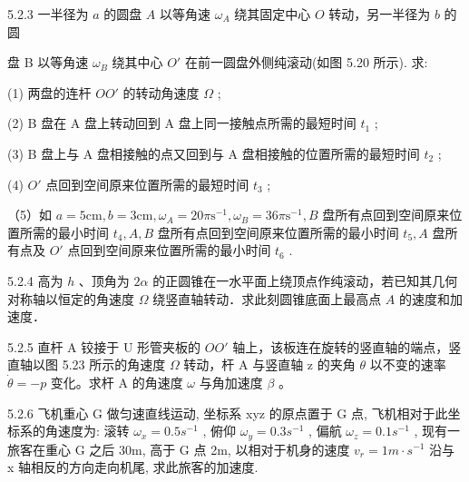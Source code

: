 \begin{problem}{5.2.3}
一半径为 $a$ 的圆盘 $A$ 以等角速 $\omega_{A}$ 绕其固定中心 $O$ 转动，另一半径为 $b$ 的圆

盘 B 以等角速 $\omega_{B}$ 绕其中心 $O'$ 在前一圆盘外侧纯滚动(如图 5.20 所示). 求:

(1) 两盘的连杆 $OO'$ 的转动角速度 $\Omega$ ;

(2) B 盘在 A 盘上转动回到 A 盘上同一接触点所需的最短时间 $t_{1}$ ;

(3) B 盘上与 A 盘相接触的点又回到与 A 盘相接触的位置所需的最短时间 $t_{2}$ ;

(4) $O'$ 点回到空间原来位置所需的最短时间 $t_3$ ;

（5）如 $a = 5\mathrm{cm}, b = 3\mathrm{cm}, \omega_A = 20\pi \mathrm{s}^{-1}, \omega_B = 36\pi \mathrm{s}^{-1}, B$ 盘所有点回到空间原来位置所需的最小时间 $t_4, A, B$ 盘所有点回到空间原来位置所需的最小时间 $t_5, A$ 盘所有点及 $O'$ 点回到空间原来位置所需的最小时间 $t_6$ .
\begin{center}

\end{center}
\end{problem}
\clearpage


\begin{problem}{5.2.4}
高为 $h$ 、顶角为 $2\alpha$ 的正圆锥在一水平面上绕顶点作纯滚动，若已知其几何对称轴以恒定的角速度 $\Omega$ 绕竖直轴转动．求此刻圆锥底面上最高点 $A$ 的速度和加速度．
\end{problem}
\clearpage


\begin{problem}{5.2.5}
直杆 A 铰接于 U 形管夹板的 $OO'$ 轴上，该板连在旋转的竖直轴的端点，竖直轴以图 5.23 所示的角速度 $\Omega$ 转动，杆 A 与竖直轴 z 的夹角 $\theta$ 以不变的速率 $\dot{\theta} = -p$ 变化。求杆 A 的角速度 $\omega$ 与角加速度 $\beta$ 。
\begin{center}

\end{center}
\end{problem}
\clearpage


\begin{problem}{5.2.6}
飞机重心 G 做匀速直线运动, 坐标系 xyz 的原点置于 G 点, 飞机相对于此坐标系的角速度为: 滚转 $\omega_{x}=0.5s^{-1}$ , 俯仰 $\omega_{y}=0.3s^{-1}$ , 偏航 $\omega_{z}=0.1s^{-1}$ , 现有一旅客在重心 G 之后 30m, 高于 G 点 2m, 以相对于机身的速度 $v_{r}=1m\cdot s^{-1}$ 沿与 x 轴相反的方向走向机尾, 求此旅客的加速度.
\end{problem}
\clearpage


